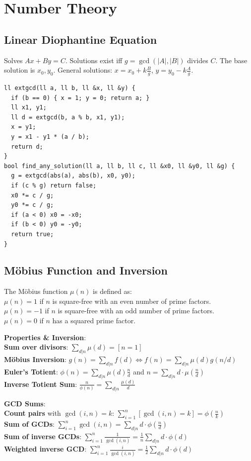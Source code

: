 \section{Number Theory}
\subsection{Linear Diophantine Equation}
Solves $Ax + By = C$. Solutions exist iff $g = \gcd(|A|, |B|)$ divides $C$.
The base solution is $x_0, y_0$. General solutions: $x = x_0 + k \frac{B}{g}$, $y = y_0 - k \frac{A}{g}$.
\begin{verbatim}
ll extgcd(ll a, ll b, ll &x, ll &y) {
  if (b == 0) { x = 1; y = 0; return a; }
  ll x1, y1;
  ll d = extgcd(b, a % b, x1, y1);
  x = y1;
  y = x1 - y1 * (a / b);
  return d;
}
bool find_any_solution(ll a, ll b, ll c, ll &x0, ll &y0, ll &g) {
  g = extgcd(abs(a), abs(b), x0, y0);
  if (c % g) return false;
  x0 *= c / g;
  y0 *= c / g;
  if (a < 0) x0 = -x0;
  if (b < 0) y0 = -y0;
  return true;
}
\end{verbatim}
\subsection{Möbius Function and Inversion}

The Möbius function $\mu(n)$ is defined as: \\
\textbullet{} $\mu(n) = 1$ if $n$ is square-free with an even number of prime factors. \\
\textbullet{} $\mu(n) = -1$ if $n$ is square-free with an odd number of prime factors. \\
\textbullet{} $\mu(n) = 0$ if $n$ has a squared prime factor.

\textbf{Properties \& Inversion}: \\
\textbullet{} \textbf{Sum over divisors}: $\sum_{d|n} \mu(d) = [n = 1]$ \\
\textbullet{} \textbf{Möbius Inversion}: 
$g(n) = \sum_{d|n} f(d) \iff f(n) = \sum_{d|n} \mu(d)g(n/d)$ \\
\textbullet{} \textbf{Euler's Totient}: $\phi(n) = \sum_{d|n} \mu(d) \frac{n}{d}$ and $n = \sum_{d|n} d \cdot \mu\left(\frac{n}{d}\right)$ \\
\textbullet{} \textbf{Inverse Totient Sum}: $\frac{n}{\phi(n)} = \sum_{d|n} \frac{\mu(d)}{d}$

\textbf{GCD Sums}: \\
\textbullet{} \textbf{Count pairs} with $\gcd(i, n)=k$: $\sum_{i=1}^n [\gcd(i, n) = k] = \phi\left(\frac{n}{k}\right)$ \\
\textbullet{} \textbf{Sum of GCDs}: $\sum_{i=1}^n \gcd(i, n) = \sum_{d|n} d \cdot \phi\left(\frac{n}{d}\right)$ \\
\textbullet{} \textbf{Sum of inverse GCDs}: $\sum_{i=1}^n \frac{1}{\gcd(i,n)} = \frac{1}{n} \sum_{d|n} d \cdot \phi(d)$ \\
\textbullet{} \textbf{Weighted inverse GCD}: $\sum_{i=1}^n \frac{i}{\gcd(i,n)} = \frac{1}{2} \sum_{d|n} d \cdot \phi(d)$
